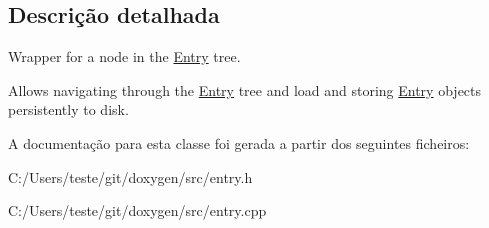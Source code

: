 \subsection{Descrição detalhada}
Wrapper for a node in the \hyperlink{class_entry}{Entry} tree.

Allows navigating through the \hyperlink{class_entry}{Entry} tree and load and storing \hyperlink{class_entry}{Entry} objects persistently to disk. 

A documentação para esta classe foi gerada a partir dos seguintes ficheiros\-:\begin{DoxyCompactItemize}
\item 
C\-:/\-Users/teste/git/doxygen/src/entry.\-h\item 
C\-:/\-Users/teste/git/doxygen/src/entry.\-cpp\end{DoxyCompactItemize}
